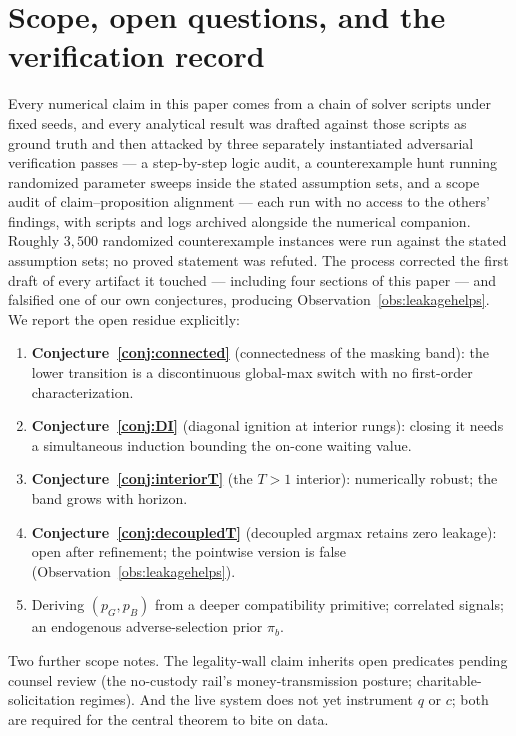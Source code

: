 \documentclass[11pt]{article}
\theoremstyle{definition}
\theoremstyle{remark}
\begin{document}
\section{Scope, open questions, and the verification record}\label{sec:scope}

Every numerical claim in this paper comes from a chain of solver scripts under fixed
seeds, and every analytical result was drafted against those scripts as ground truth and
then attacked by three separately instantiated adversarial verification passes --- a
step-by-step logic audit, a counterexample hunt running randomized parameter sweeps inside
the stated assumption sets, and a scope audit of claim--proposition alignment --- each run
with no access to the others' findings, with scripts and logs archived alongside the
numerical companion. Roughly
$3{,}500$ randomized counterexample instances were run against the stated assumption sets;
no proved statement was refuted. The process corrected the first draft of every artifact
it touched --- including four sections of this paper --- and falsified one of our own
conjectures, producing Observation~\ref{obs:leakagehelps}. We report the open residue explicitly:

\begin{enumerate}
\item \textbf{Conjecture~\ref{conj:connected}} (connectedness of the masking band): the
lower transition is a discontinuous global-max switch with no first-order
characterization.
\item \textbf{Conjecture~\ref{conj:DI}} (diagonal ignition at interior rungs): closing it
needs a simultaneous induction bounding the on-cone waiting value.
\item \textbf{Conjecture~\ref{conj:interiorT}} (the $T>1$ interior): numerically robust;
the band grows with horizon.
\item \textbf{Conjecture~\ref{conj:decoupledT}} (decoupled argmax retains zero leakage):
open after refinement; the pointwise version is false
(Observation~\ref{obs:leakagehelps}).
\item Deriving $(p_G,p_B)$ from a deeper compatibility primitive; correlated signals; an
endogenous adverse-selection prior $\pi_b$.
\end{enumerate}

Two further scope notes. The legality-wall claim inherits open predicates pending counsel
review (the no-custody rail's money-transmission posture; charitable-solicitation
regimes). And the live system does not yet instrument $q$ or $c$; both are required for
the central theorem to bite on data.
\end{document}
